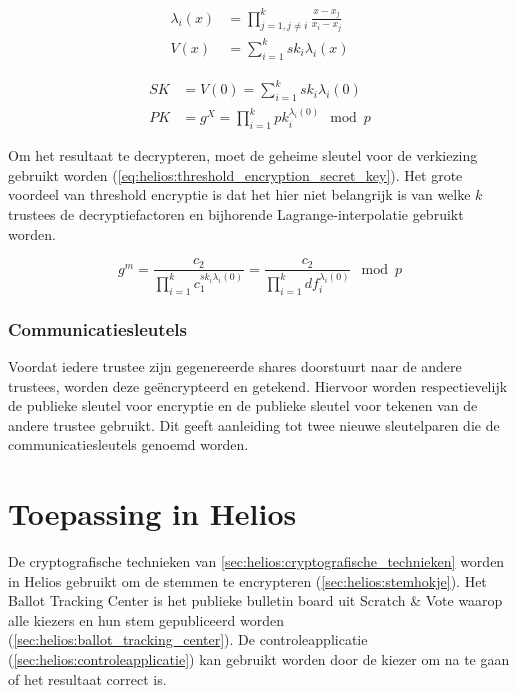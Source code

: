 \begin{align}
  \label{eq:helios:threshold_encryption_lagrange}
  \lambda_i(x) & = \prod_{j=1, j\not=i}^k{\frac{x - x_j}{x_i - x_j}} \\
  \label{eq:helios:threshold_encryption_polynomial}
  V(x) & = \sum_{i=1}^k{{sk}_i\lambda_i(x)}
\end{align}

\begin{align}
  \label{eq:helios:threshold_encryption_secret_key}
  SK & = V(0) = \sum_{i=1}^k{{sk}_i\lambda_i(0)} \\
  \label{eq:helios:threshold_encryption_public_key}
  PK & = g^{X} = \prod_{i=1}^k{{pk}_i^{\lambda_i(0)}} \mod{p}
\end{align}

\npar Om het resultaat te decrypteren, moet de geheime sleutel voor de verkiezing gebruikt worden (\ref{eq:helios:threshold_encryption_secret_key}). Het grote voordeel van threshold encryptie is dat het hier niet belangrijk is van welke $k$ trustees de decryptiefactoren en bijhorende Lagrange-interpolatie gebruikt worden.

\begin{equation}
  \label{eq:helios:threshold_encryption_m}
  g^m = \frac{c_2}{\prod_{i=1}^k{c_1^{{sk}_i\lambda_i(0)}}} = \frac{c_2}{\prod_{i=1}^k{{df}_i^{\lambda_i(0)}}} \mod{p}
\end{equation}

\subsubsection{Communicatiesleutels}
\label{sec:helios:communicatiesleutels}

Voordat iedere trustee zijn gegenereerde shares doorstuurt naar de andere trustees, worden deze ge\"encrypteerd en getekend. Hiervoor worden respectievelijk de publieke sleutel voor encryptie en de publieke sleutel voor tekenen van de andere trustee gebruikt. Dit geeft aanleiding tot twee nieuwe sleutelparen die de communicatiesleutels genoemd worden.

\section{Toepassing in Helios}

De cryptografische technieken van \ref{sec:helios:cryptografische_technieken} worden in Helios gebruikt om de stemmen te encrypteren (\ref{sec:helios:stemhokje}). Het Ballot Tracking Center is het publieke bulletin board uit Scratch \& Vote waarop alle kiezers en hun stem gepubliceerd worden (\ref{sec:helios:ballot_tracking_center}). De controleapplicatie (\ref{sec:helios:controleapplicatie}) kan gebruikt worden door de kiezer om na te gaan of het resultaat correct is.

